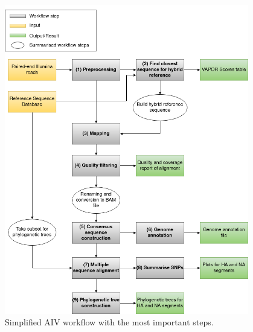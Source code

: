 \begin{figure}[ht!]
	\includegraphics[width=0.95\textwidth]{media/aiv.png}
	\caption{Simplified AIV workflow with the most important steps.}
	\label{fig:3-aiv-wf}
\end{figure}

